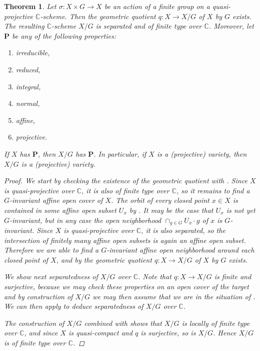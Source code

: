\documentclass[12pt,a4paper]{amsart}
\theoremstyle{plain}
\newtheorem{thm}{Theorem}[section]
\theoremstyle{definition}
\theoremstyle{remark}
\begin{document}
\begin{thm}\label{thm:quotient}
  Let $\sigma \colon X \times G \to X$ be an action of a finite group on a quasi-projective $\mathbb{C}$-scheme.
  Then the geometric quotient $q \colon X \to X/G$ of $X$ by $G$ exists.
  The resulting $\mathbb{C}$-scheme $X/G$ is separated and of finite type over $\mathbb{C}$.
  Moreover, let $\mathbf{P}$ be any of the following properties:
  \begin{enumerate}[label=(\alph*)]
    \item irreducible,
    \item reduced,
    \item integral,
    \item normal,
    \item affine,
    \item projective.
  \end{enumerate}
  If $X$ has $\mathbf{P}$, then $X/G$ has $\mathbf{P}$.
  In particular, if $X$ is a (projective) variety, then $X/G$ is a (projective) variety.

  \begin{proof}
    We start by checking the existence of the geometric quotient with .
    Since $X$ is quasi-projective over $\mathbb{C}$, it is also of finite type over $\mathbb{C}$, so it remains to find a $G$-invariant affine open cover of $X$.
    The orbit of every closed point $x \in X$ is contained in some affine open subset $U_{x}$ by .
    It may be the case that $U_{x}$ is not yet $G$-invariant, but in any case the open neighborhood $\cap_{g \in G} U_{x}\cdot g$ of $x$ is $G$-invariant.
    Since $X$ is quasi-projective over $\mathbb{C}$, it is also separated, so the intersection of finitely many affine open subsets is again an affine open subset.
    Therefore we are able to find a $G$-invariant affine open neighborhood around each closed point of $X$, and by  the geometric quotient $q \colon X \to X/G$ of $X$ by $G$ exists.

    We show next separatedness of $X/G$ over $\mathbb{C}$.
    Note that $q \colon X \to X/G$ is finite and surjective, because we may check these properties on an open cover of the target and by construction of $X/G$ we may then assume that we are in the situation of .
    We can then apply \cite[\href{https://stacks.math.columbia.edu/tag/09MQ}{Tag 09MQ}]{stacks-project} to deduce separatedness of $X/G$ over $\mathbb{C}$.

    The construction of $X/G$ combined with  shows that $X/G$ is locally of finite type over $\mathbb{C}$, and since $X$ is quasi-compact and $q$ is surjective, so is $X/G$.
    Hence $X/G$ is of finite type over $\mathbb{C}$.
    

\end{proof}
\end{thm}
\end{document}

